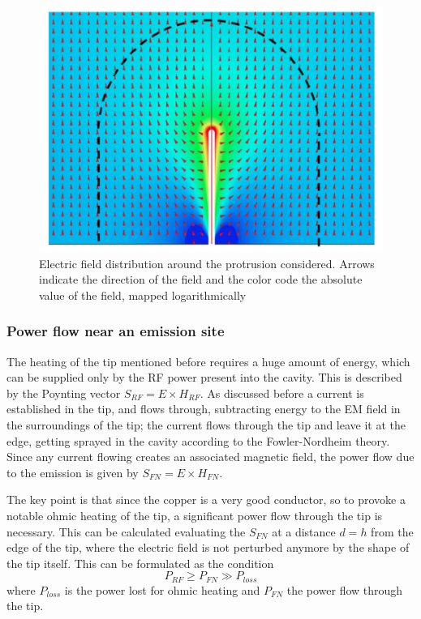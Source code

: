 \begin{figure}[h]
\centering

\includegraphics[scale=0.3]{pictures/field_S_c}
\caption{Electric field distribution around the protrusion considered. Arrows indicate the direction of the field and the color code the absolute value of the field, mapped logarithmically \cite{Grudiev:newLoc} }
\label{kilpPlot}

\end{figure}



\subsubsection{Power flow near an emission site}

The heating of the tip mentioned before requires a huge amount of energy, which can be supplied only by the RF power present into the cavity. This is described by the Poynting vector $S_{RF} = E\times H_{RF}$. As discussed before a current is established in the tip, and flows through, subtracting energy to the EM field in the surroundings of the tip; the current flows through the tip and leave it at the edge, getting sprayed in the cavity according to the Fowler-Nordheim theory. Since any current flowing creates an associated magnetic field, the power flow due to the emission is given by $S_{FN}=E\times H_{FN}$. 

The key point is that since the copper is a very good conductor, so to provoke a notable ohmic heating of the tip, a significant power flow through the tip is necessary. This can be calculated evaluating the $S_{FN}$ at a distance $d=h$ from the edge of the tip, where the electric field is not perturbed anymore by the shape of the tip itself. This can be formulated as the condition 
\begin{equation}
P_{RF} \ge P_{FN} \gg P_{loss}
\end{equation}
where $P_{loss}$ is the power lost for ohmic heating and $P_{FN}$ the power flow through the tip.

